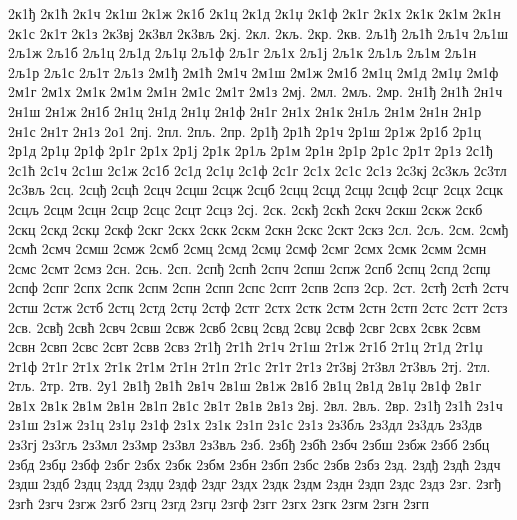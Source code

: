 {2к1ђ
2к1ћ
2к1ч
2к1ш
2к1ж
2к1б
2к1ц
2к1д
2к1џ
2к1ф
2к1г
2к1х
2к1к
2к1м
2к1н
2к1с
2к1т
2к1з
2к3вј
2к3вл
2к3вљ
2кј.
2кл.
2кљ.
2кр.
2кв.
2љ1ђ
2љ1ћ
2љ1ч
2љ1ш
2љ1ж
2љ1б
2љ1ц
2љ1д
2љ1џ
2љ1ф
2љ1г
2љ1х
2љ1ј
2љ1к
2љ1љ
2љ1м
2љ1н
2љ1р
2љ1с
2љ1т
2љ1з
2м1ђ
2м1ћ
2м1ч
2м1ш
2м1ж
2м1б
2м1ц
2м1д
2м1џ
2м1ф
2м1г
2м1х
2м1к
2м1м
2м1н
2м1с
2м1т
2м1з
2мј.
2мл.
2мљ.
2мр.
2н1ђ
2н1ћ
2н1ч
2н1ш
2н1ж
2н1б
2н1ц
2н1д
2н1џ
2н1ф
2н1г
2н1х
2н1к
2н1љ
2н1м
2н1н
2н1р
2н1с
2н1т
2н1з
2о1
2пј.
2пл.
2пљ.
2пр.
2р1ђ
2р1ћ
2р1ч
2р1ш
2р1ж
2р1б
2р1ц
2р1д
2р1џ
2р1ф
2р1г
2р1х
2р1ј
2р1к
2р1љ
2р1м
2р1н
2р1р
2р1с
2р1т
2р1з
2с1ђ
2с1ћ
2с1ч
2с1ш
2с1ж
2с1б
2с1д
2с1џ
2с1ф
2с1г
2с1х
2с1с
2с1з
2с3кј
2с3кљ
2с3тл
2с3вљ
2сц.
2сцђ
2сцћ
2сцч
2сцш
2сцж
2сцб
2сцц
2сцд
2сцџ
2сцф
2сцг
2сцх
2сцк
2сцљ
2сцм
2сцн
2сцр
2сцс
2сцт
2сцз
2сј.
2ск.
2скђ
2скћ
2скч
2скш
2скж
2скб
2скц
2скд
2скџ
2скф
2скг
2скх
2скк
2скм
2скн
2скс
2скт
2скз
2сл.
2сљ.
2см.
2смђ
2смћ
2смч
2смш
2смж
2смб
2смц
2смд
2смџ
2смф
2смг
2смх
2смк
2смм
2смн
2смс
2смт
2смз
2сн.
2сњ.
2сп.
2спђ
2спћ
2спч
2спш
2спж
2спб
2спц
2спд
2спџ
2спф
2спг
2спх
2спк
2спм
2спн
2спп
2спс
2спт
2спв
2спз
2ср.
2ст.
2стђ
2стћ
2стч
2стш
2стж
2стб
2стц
2стд
2стџ
2стф
2стг
2стх
2стк
2стм
2стн
2стп
2стс
2стт
2стз
2св.
2свђ
2свћ
2свч
2свш
2свж
2свб
2свц
2свд
2свџ
2свф
2свг
2свх
2свк
2свм
2свн
2свп
2свс
2свт
2свв
2свз
2т1ђ
2т1ћ
2т1ч
2т1ш
2т1ж
2т1б
2т1ц
2т1д
2т1џ
2т1ф
2т1г
2т1х
2т1к
2т1м
2т1н
2т1п
2т1с
2т1т
2т1з
2т3вј
2т3вл
2т3вљ
2тј.
2тл.
2тљ.
2тр.
2тв.
2у1
2в1ђ
2в1ћ
2в1ч
2в1ш
2в1ж
2в1б
2в1ц
2в1д
2в1џ
2в1ф
2в1г
2в1х
2в1к
2в1м
2в1н
2в1п
2в1с
2в1т
2в1в
2в1з
2вј.
2вл.
2вљ.
2вр.
2з1ђ
2з1ћ
2з1ч
2з1ш
2з1ж
2з1ц
2з1џ
2з1ф
2з1х
2з1к
2з1п
2з1с
2з1з
2з3бљ
2з3дл
2з3дљ
2з3дв
2з3гј
2з3гљ
2з3мл
2з3мр
2з3вл
2з3вљ
2зб.
2збђ
2збћ
2збч
2збш
2збж
2збб
2збц
2збд
2збџ
2збф
2збг
2збх
2збк
2збм
2збн
2збп
2збс
2збв
2збз
2зд.
2здђ
2здћ
2здч
2здш
2здб
2здц
2здд
2здџ
2здф
2здг
2здх
2здк
2здм
2здн
2здп
2здс
2здз
2зг.
2згђ
2згћ
2згч
2згж
2згб
2згц
2згд
2згџ
2згф
2згг
2згх
2згк
2згм
2згн
2згп
}
